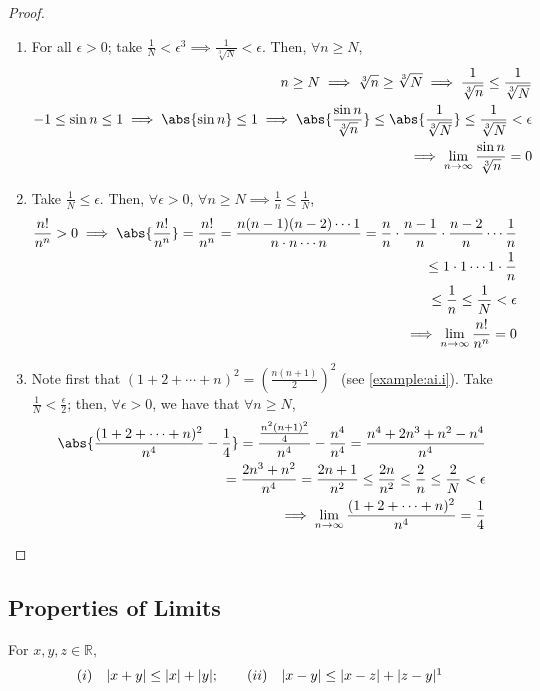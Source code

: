 \documentclass[12pt]{article}
\begin{document}
\begin{proof}
  \begin{enumerate}
    \item For all $\epsilon > 0$; take $\frac{1}{N} < \epsilon^3 \implies \frac{1}{\sqrt[3]{N}} < \epsilon$. Then, $\forall n \geq N$, \begin{align*}
      n \geq N \implies \sqrt[3]{n} \geq \sqrt[3]{N} \implies \frac{1}{\sqrt[3]{n}} \leq \frac{1}{\sqrt[3]{N}}\\
      -1 \leq \sin n \leq 1 \implies \abs{\sin n} \leq 1 \implies \abs{\frac{\sin n}{\sqrt[3]{n}}} \leq \abs{\frac{1}{\sqrt[3]{N}}} \leq \frac{1}{\sqrt[3]{N}} < \epsilon\\
      \implies \lim_{n\to\infty} \frac{\sin n}{\sqrt[3]{n}} = 0
    \end{align*}
    \item Take $\frac{1}{N} \leq \epsilon$. Then, $\forall \epsilon > 0$, $\forall n \geq N \implies \frac{1}{n} \leq \frac{1}{N}$, \begin{align*}
      \frac{n!}{n^n} > 0 \implies \abs{\frac{n!}{n^n}} = \frac{n!}{n^n} = \frac{n(n-1)(n-2)\cdots 1}{n\cdot n \cdots n} = \frac{n}{n} \cdot \frac{n-1}{n} \cdot \frac{n-2}{n} \cdots \frac{1}{n}\\
      \leq 1 \cdot 1 \cdots 1 \cdot \frac{1}{n}\\
      \leq \frac{1}{n} \leq \frac{1}{N} < \epsilon\\
      \implies \lim_{n\to\infty} \frac{n!}{n^n} = 0
    \end{align*}
    \item Note first that $(1+2+ \cdots + n)^2 = (\frac{n(n+1)}{2})^2$ (see \cref{example:ai.i}). Take $\frac{1}{N} < \frac{\epsilon}{2}$; then, $\forall \epsilon > 0$, we have that $\forall n \geq N$, \begin{align*}
      \abs{\frac{(1+2+\cdots + n)^2}{n^4} - \frac{1}{4}} = \frac{\frac{n^2(n+1)^2}{4}}{n^4} - \frac{n^4}{n^4} = \frac{n^4+2n^3+n^2 - n^4}{n^4}\\
      = \frac{2n^3 + n^2}{n^4} = \frac{2n+1}{n^2} \leq \frac{2n}{n^2} \leq \frac{2}{n} \leq \frac{2}{N} < \epsilon\\
      \implies \lim_{n\to\infty} \frac{(1+2+\cdots + n)^2}{n^4} = \frac{1}{4}
    \end{align*}
  \end{enumerate}
\end{proof}

\subsection{Properties of Limits}
\begin{lemma}
  For $x,y,z \in \mathbb{R},$
  \[(i)\quad|x + y|  \leq |x| + |y|; \qquad (ii) \quad|x-y| \leq |x-z| + |z-y|\footnotemark\]
\end{lemma}
\end{document}
